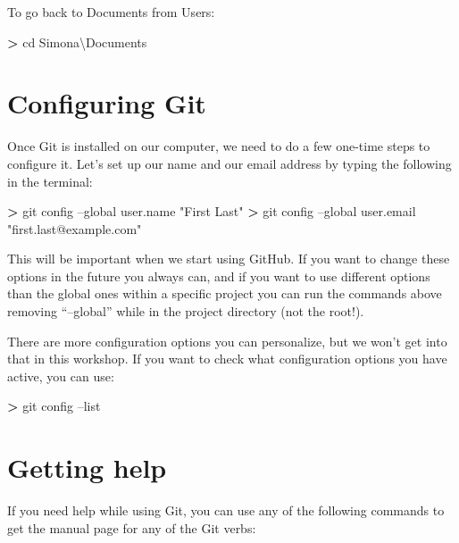 \documentclass[
]{book}
\newenvironment{Shaded}{\begin{snugshade}}{\end{snugshade}}
\newcommand{\BuiltInTok}[1]{#1}
\newcommand{\FunctionTok}[1]{\textcolor[rgb]{0.00,0.00,0.00}{#1}}
\newcommand{\NormalTok}[1]{#1}
\newcommand{\OperatorTok}[1]{\textcolor[rgb]{0.81,0.36,0.00}{\textbf{#1}}}
\newcommand{\StringTok}[1]{\textcolor[rgb]{0.31,0.60,0.02}{#1}}
\begin{document}
To go back to Documents from Users:

\begin{Shaded}
\begin{Highlighting}[]
\OperatorTok{>} \BuiltInTok{cd}\NormalTok{ Simona\textbackslash{}Documents}
\end{Highlighting}
\end{Shaded}

\hypertarget{configuring-git}{%
\section{Configuring Git}\label{configuring-git}}

Once Git is installed on our computer, we need to do a few one-time steps to configure it. Let's set up our name and our email address by typing the following in the terminal:

\begin{Shaded}
\begin{Highlighting}[]
\OperatorTok{>} \FunctionTok{git}\NormalTok{ config --global user.name }\StringTok{"First Last"}
\OperatorTok{>} \FunctionTok{git}\NormalTok{ config --global user.email }\StringTok{"first.last@example.com"}
\end{Highlighting}
\end{Shaded}

This will be important when we start using GitHub. If you want to change these options in the future you always can, and if you want to use different options than the global ones within a specific project you can run the commands above removing ``--global'' while in the project directory (not the root!).

There are more configuration options you can personalize, but we won't get into that in this workshop. If you want to check what configuration options you have active, you can use:

\begin{Shaded}
\begin{Highlighting}[]
\OperatorTok{>} \FunctionTok{git}\NormalTok{ config --list}
\end{Highlighting}
\end{Shaded}

\hypertarget{getting-help}{%
\section{Getting help}\label{getting-help}}

If you need help while using Git, you can use any of the following commands to get the manual page for any of the Git verbs:
\end{document}
